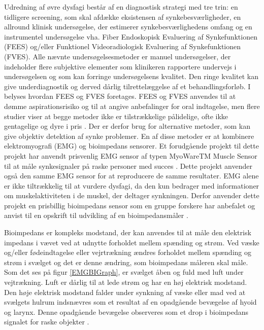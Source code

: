   Udredning af øvre dysfagi består af en diagnostisk strategi med tre trin: en tidligere screening, som skal afdække eksistensen af synkebesværligheder, en allround klinisk undersøgelse, der estimerer synkebesværlighedens omfang og en instrumentel undersøgelse vha. Fiber Endoskopisk Evaluering af Synkefunktionen (FEES) og/eller Funktionel Videoradiologisk Evaluering af Synkefunktionen (FVES). Alle nævnte undersøgelsesmetoder er manuel undersøgelser, der indeholder flere subjektive elementer som klinikeren rapportere undervejs i undersøgelsen og som kan forringe undersøgelsens kvalitet. Den ringe kvalitet kan give underdiagnostik og derved dårlig tilrettelæggelse af et behandlingsforløb. I  belyses hvordan FEES og FVES foretages. FEES og FVES anvendes til at dømme aspirationsrisiko og til at angive anbefalinger for oral indtagelse, men flere studier viser at begge metoder ikke er tilstrækkelige pålidelige,  ofte ikke gentagelige og dyre i pris \cite{Kelly2006} \cite{McCullough2001Inter-Measures} \cite{Schultheiss2014} \cite{Nahrstaedt2012SwallowMeasurements}.  Der er derfor brug for alternative metoder, som kan give objektiv detektion af synke problemer. En af disse metoder er at kombinere elektromyografi (EMG) og bioimpedans sensorer. Et forudgående projekt til dette projekt har anvendt prisvenlig EMG sensor af typen MyoWareTM Muscle Sensor til at måle synkesignaler på raske personer med succes \cite[s. 58]{ChristensenElisabethLundbakStrand2017}. Dette projekt anvender også den samme EMG sensor for at reproducere de samme resultater. EMG alene er ikke tiltrækkelig til at vurdere dysfagi, da den kun bedrager med informationer om muskelaktiviteten i de muskel, der deltager synkningen. Derfor anvender dette projekt en prisbillig bioimpedans sensor som en gruppe forskere har anbefalet og anvist til en opskrift til udvikling af en bioimpedansmåler \cite{Aroom2009}.

Bioimpedans er kompleks modstand, der kan anvendes til at måle den elektrisk impedans i vævet ved at udnytte forholdet mellem spænding og strøm. Ved væske og/eller fødeindtagelse eller vejrtrækning ændres forholdet mellem spænding og strøm i svælget og det er denne ændring, som bioimpedans måleren skal måle. Som det ses på figur \ref{EMGBIGraph}, er svælget åben og fuld med luft under vejtrækning. Luft er dårlig til at lede strøm og har en høj elektrisk modstand. Den høje elektrisk modstand falder under synkning af væske eller mad ved at svælgets hulrum indsnævres som et resultat af en opadgående bevægelse af hyoid og larynx. Denne opadgående bevægelse observeres som et drop i bioimpedans signalet for raske objekter \cite{Schultheiss2014}.         



